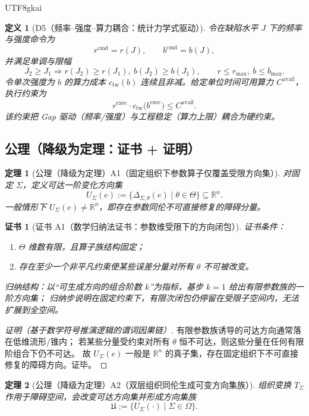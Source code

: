 \documentclass[12pt]{article}
\newtheorem{definition}{定义}[section]
\newtheorem{theorem}{定理}[section]
\newtheorem{Certificate}{证书}[section]
\newcommand{\RR}{\mathbb{R}}
\begin{document}
\begin{CJK*}{UTF8}{gkai}
\begin{definition}[D5（频率--强度--算力耦合：统计力学式驱动）]
\label{def:tex28-ch9-d5}
令在缺陷水平 $J$ 下的频率与强度命令为
\[
  r^{\mathrm{cmd}}=r(J),\qquad b^{\mathrm{cmd}}=b(J),
\]
并满足单调与限幅
\[
  J_2\ge J_1\Rightarrow r(J_2)\ge r(J_1),\ b(J_2)\ge b(J_1),\qquad
  r\le r_{\max},\ b\le b_{\max}.
\]
令单次强度为 $b$ 的算力成本 $c_{\mathrm{tw}}(b)$ 连续且非减。给定单位时间可用算力 $C^{\mathrm{avail}}$，
执行约束为
\[
  r^{\mathrm{exec}}\cdot c_{\mathrm{tw}}\!\bigl(b^{\mathrm{exec}}\bigr)\le C^{\mathrm{avail}}.
\]
该约束把 Gap 驱动（频率/强度）与工程稳定（算力上限）耦合为硬约束。
\end{definition}

\subsection{公理（降级为定理：证书 + 证明）}
\label{subsec:tex28-ch9-axioms}

\begin{theorem}[公理（降级为定理）A1（固定组织下参数算子仅覆盖受限方向集）]
\label{thm:tex28-ch9-a1}
对固定 $\Sigma$，定义可达一阶变化方向集
\[
  U_{\Sigma}(e):=\{\Delta_{\Sigma,\theta}(e)\mid \theta\in\Theta\}\subseteq \RR^n.
\]
一般情形下 $U_{\Sigma}(e)\neq \RR^n$，即存在参数同伦不可直接修复的障碍分量。
\end{theorem}

\begin{Certificate}[证书 A1（数学归纳法证书：参数维受限下的方向闭包）]
\label{cert:tex28-ch9-a1}
证书条件：
\begin{enumerate}
  \item $\Theta$ 维数有限，且算子族结构固定；
  \item 存在至少一个非平凡约束使某些误差分量对所有 $\theta$ 不可被改变。
\end{enumerate}
归纳结构：以“可生成方向的组合阶数 $k$”为指标，基步 $k=1$ 给出有限参数族的一阶方向集；
归纳步说明在固定约束下，有限次闭包仍停留在受限子空间内，无法扩展到全空间。
\end{Certificate}

\begin{proof}[证明（基于数学符号推演逻辑的谓词因果链）]
有限参数族诱导的可达方向通常落在低维流形/锥内；
若某些分量受约束对所有 $\theta$ 恒不可达，则这些分量在任何有限阶组合下仍不可达。
故 $U_{\Sigma}(e)$ 一般是 $\RR^n$ 的真子集，存在固定组织下不可直接修复的障碍方向。证毕。
\end{proof}

\begin{theorem}[公理（降级为定理）A2（双层组织同伦生成可变方向集族）]
\label{thm:tex28-ch9-a2}
组织变换 $T_{\Sigma}$ 作用于障碍空间，会改变可达方向集并形成方向集族
\[
  \mathfrak{U}:=\{U_{\Sigma}(\cdot)\mid \Sigma\in\Omega\}.
\]
\end{theorem}


\end{CJK*}
\end{document}
